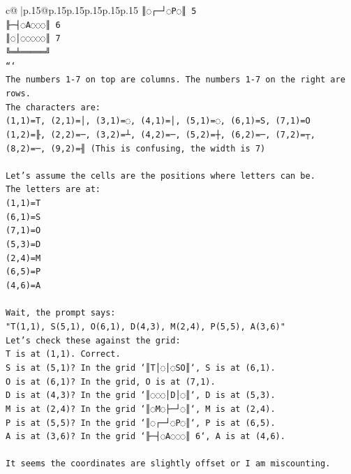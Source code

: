 \documentclass{article}
\begin{document}
{\begin{supertabular}{c@{$\;$}|p{.15\linewidth}@{}p{.15\linewidth}p{.15\linewidth}p{.15\linewidth}p{.15\linewidth}p{.15\linewidth}}
{{{\texttt{║◌┌─┘◌P◌║ 5} \\
\texttt{╟─┤◌A◌◌◌║ 6} \\
\texttt{║◌│◌◌◌◌◌║ 7} \\
\texttt{╚═╧═════╝} \\
\texttt{```} \\
\texttt{The numbers 1{-}7 on top are columns. The numbers 1{-}7 on the right are rows.} \\
\texttt{The characters are:} \\
\texttt{(1,1)=T, (2,1)=│, (3,1)=◌, (4,1)=│, (5,1)=◌, (6,1)=S, (7,1)=O} \\
\texttt{(1,2)=╟, (2,2)=─, (3,2)=┴, (4,2)=─, (5,2)=┼, (6,2)=─, (7,2)=┬, (8,2)=─, (9,2)=╢ (This is confusing, the width is 7)} \\
\\ 
\texttt{Let's assume the cells are the positions where letters can be.} \\
\texttt{The letters are at:} \\
\texttt{(1,1)=T} \\
\texttt{(6,1)=S} \\
\texttt{(7,1)=O} \\
\texttt{(5,3)=D} \\
\texttt{(2,4)=M} \\
\texttt{(6,5)=P} \\
\texttt{(4,6)=A} \\
\\ 
\texttt{Wait, the prompt says:} \\
\texttt{"T(1,1), S(5,1), O(6,1), D(4,3), M(2,4), P(5,5), A(3,6)"} \\
\texttt{Let's check these against the grid:} \\
\texttt{T is at (1,1). Correct.} \\
\texttt{S is at (5,1)? In the grid `║T│◌│◌SO║`, S is at (6,1).} \\
\texttt{O is at (6,1)? In the grid, O is at (7,1).} \\
\texttt{D is at (4,3)? In the grid `║◌◌◌│D│◌║`, D is at (5,3).} \\
\texttt{M is at (2,4)? In the grid `║◌M◌├─┘◌║`, M is at (2,4).} \\
\texttt{P is at (5,5)? In the grid `║◌┌─┘◌P◌║`, P is at (6,5).} \\
\texttt{A is at (3,6)? In the grid `╟─┤◌A◌◌◌║ 6`, A is at (4,6).} \\
\\ 
\texttt{It seems the coordinates are slightly offset or I am miscounting.} \\
}}}
\end{supertabular}}
\end{document}
